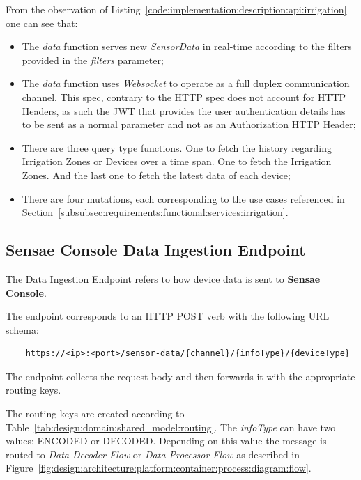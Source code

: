 From the observation of Listing~\ref{code:implementation:description:api:irrigation} one can see that:

\begin{itemize}
    \item The \textit{data} function serves new \textit{SensorData} in real-time according to the filters provided in the \textit{filters} parameter;
    \item The \textit{data} function uses \textit{Websocket} to operate as a full duplex communication channel. This spec, contrary to the HTTP spec does not account for HTTP Headers, as such the \gls{JWT} that provides the user authentication details has to be sent as a normal parameter and not as an Authorization HTTP Header;
    \item  There are three query type functions. One to fetch the history regarding Irrigation Zones or Devices over a time span. One to fetch the Irrigation Zones. And the last one to fetch the latest data of each device;
    \item There are four mutations, each corresponding to the use cases referenced in Section~\ref{subsubsec:requirements:functional:services:irrigation}.
\end{itemize}

\subsection{Sensae Console Data Ingestion Endpoint}
\label{subsec:implementation:description:ingestion}

The Data Ingestion Endpoint refers to how device data is sent to \textbf{Sensae Console}.

The endpoint corresponds to an HTTP POST verb with the following \gls{URL} schema:

\begin{verbatim}
    https://<ip>:<port>/sensor-data/{channel}/{infoType}/{deviceType}
\end{verbatim}

The endpoint collects the request body and then forwards it with the appropriate routing keys.

The routing keys are created according to Table~\ref{tab:design:domain:shared_model:routing}. The \textit{infoType} can have two values: ENCODED or DECODED. Depending on this value the message is routed to \textit{Data Decoder Flow} or \textit{Data Processor Flow} as described in Figure~\ref{fig:design:architecture:platform:container:process:diagram:flow}.

